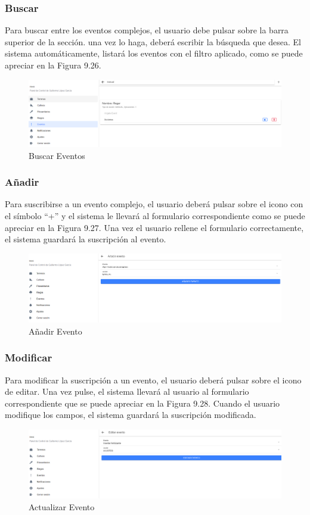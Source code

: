 \subsubsection{Buscar}
Para buscar entre los eventos complejos, el usuario debe pulsar sobre la barra superior de la sección. una vez lo haga, deberá escribir la búsqueda que desea. El sistema automáticamente, listará los eventos con el filtro aplicado, como se puede apreciar en la Figura 9.26.
\begin{figure}[H]
    \centering
    \includegraphics[width=0.7\linewidth]{images/user-manual/events/search.png}
    \caption{Buscar Eventos}
\end{figure}

\subsubsection{Añadir}
Para suscribirse a un evento complejo, el usuario deberá pulsar sobre el icono con el símbolo ``+'' y el sistema le llevará al formulario correspondiente como se puede apreciar en la Figura 9.27. Una vez el usuario rellene el formulario correctamente, el sistema guardará la suscripción al evento.
\begin{figure}[H]
    \centering
    \includegraphics[width=0.7\linewidth]{images/user-manual/events/create.png}
    \caption{Añadir Evento}
\end{figure}

\subsubsection{Modificar}
Para modificar la suscripción a un evento, el usuario deberá pulsar sobre el icono de editar. Una vez pulse, el sistema llevará al usuario al formulario correspondiente que se puede apreciar en la Figura 9.28. Cuando el usuario modifique los campos, el sistema guardará la suscripción modificada.
\begin{figure}[H]
    \centering
    \includegraphics[width=0.7\linewidth]{images/user-manual/events/update.png}
    \caption{Actualizar Evento}
\end{figure}

